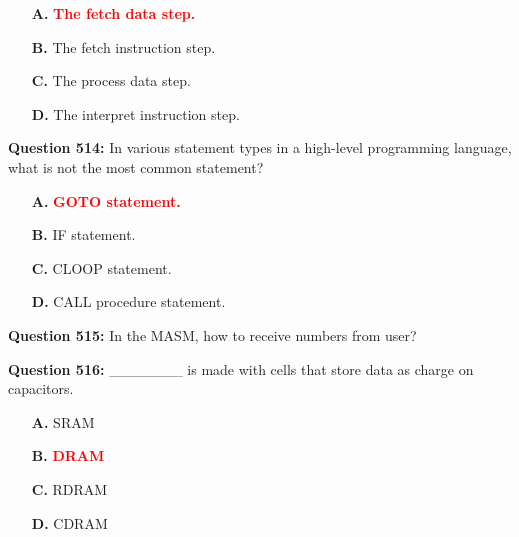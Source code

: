 \documentclass[12pt,a4paper]{article}
\begin{document}
\begin{itemize}
    \item[\textbf{A.}] \textcolor{red}{\textbf{The fetch data step.}}
    \item[\textbf{B.}] The fetch instruction step.
    \item[\textbf{C.}] The process data step.
    \item[\textbf{D.}] The interpret instruction step.
\end{itemize}

\vspace{0.5cm}

\textbf{Question 514:} In various statement types in a high-level programming language, what is not the most common statement?

\begin{itemize}
    \item[\textbf{A.}] \textcolor{red}{\textbf{GOTO statement.}}
    \item[\textbf{B.}] IF statement.
    \item[\textbf{C.}] CLOOP statement.
    \item[\textbf{D.}] CALL procedure statement.
\end{itemize}

\vspace{0.5cm}

\textbf{Question 515:} In the MASM, how to receive numbers from user?


\vspace{0.5cm}

\textbf{Question 516:} _______ is made with cells that store data as charge on capacitors.

\begin{itemize}
    \item[\textbf{A.}] SRAM
    \item[\textbf{B.}] \textcolor{red}{\textbf{DRAM}}
    \item[\textbf{C.}] RDRAM
    \item[\textbf{D.}] CDRAM
\end{itemize}
\end{document}
